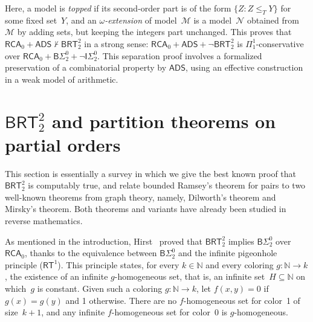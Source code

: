 \documentclass{article}
\def\M{\mathcal{M}}
\def\Nc{\mathcal{N}}
\newcommand{\ISig}{\mathsf{I}\Sigma^0}
\newcommand{\BSig}{\mathsf{B}\Sigma^0}
\newcommand{\RCA}[0]{\mathsf{RCA}}
\newcommand{\ADS}[0]{\mathsf{ADS}}
\newcommand{\RT}[0]{\mathsf{RT}}
\newcommand{\BRT}[0]{\mathsf{BRT}}
\newcommand{\NN}[0]{\mathbb{N}}
\numberwithin{theorem}{section}
\newtheorem{maintheorem}[theorem]{Main Theorem}
\newcommand{\ludovic}[1]{\textcolor{blue}{#1}}
\begin{document}

Here, a model is \emph{topped} if its second-order part is of the form $\{ Z : Z \leq_T Y \}$ for some fixed set~$Y$, and an \emph{$\omega$-extension} of model~$\M$ is a model~$\Nc$ obtained from~$\M$ by adding sets, but keeping the integers part unchanged. This proves that $\RCA_0 + \ADS \not \vdash \BRT^2_2$ in a strong sense: $\RCA_0 + \ADS + \neg \BRT^2_2$ is $\Pi^1_1$-conservative over $\RCA_0 + \BSig_2 + \neg \ISig_2$. This separation proof involves a formalized preservation of a combinatorial property by $\ADS$, using an effective construction in a weak model of arithmetic.





\section{$\BRT^2_2$ and partition theorems on partial orders}

This section is essentially a survey in which we give the best known proof that $\BRT^2_2$ is computably true, and relate bounded Ramsey's theorem for pairs to two well-known theorems from graph theory, namely, Dilworth's theorem and Mirsky's theorem. Both theorems and variants have already been studied in reverse mathematics.

As mentioned in the introduction, Hirst~\cite[Theorem 6.8]{hirst1987combinatorics} proved that $\BRT^2_2$ implies $\BSig_2$ over~$\RCA_0$, thanks to the equivalence between $\BSig_2$ and the infinite pigeonhole principle ($\RT^1$). This principle states, for every $k \in \NN$ and every coloring $g : \NN \to k$, the existence of an infinite $g$-homogeneous set, that is, an infinite set~$H \subseteq \NN$ on which~$g$ is constant. Given such a coloring $g : \NN \to k$, let $f(x, y) = 0$ if $g(x) = g(y)$ and 1 otherwise. There are no $f$-homogeneous set for color~1 of size~$k+1$, and any infinite $f$-homogeneous set for color~0 is $g$-homogeneous.
\end{document}
